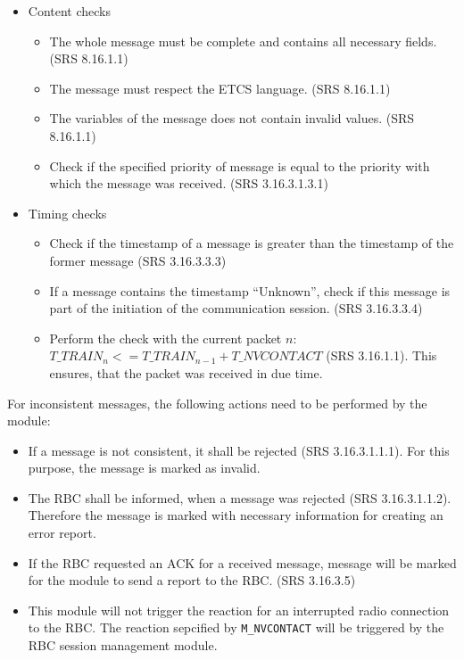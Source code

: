 \documentclass{template/openetcs_report}
\begin{document}
\begin{itemize}
 \item Content checks
 \begin{itemize}
    \item The whole message must be complete and contains all necessary fields. (SRS 8.16.1.1)
    \item The message must respect the ETCS language. (SRS 8.16.1.1)
    \item The variables of the message does not contain invalid values. (SRS 8.16.1.1) %
    \item Check if the specified priority of message is equal to the priority with which the message was received. (SRS 3.16.3.1.3.1) 
  \end{itemize}
  \item Timing checks
  \begin{itemize}
    \item Check if the timestamp of a message is greater than the timestamp of the former message (SRS 3.16.3.3.3)
    \item If a message contains the timestamp ``Unknown'', check if this message is part of the initiation of the communication session. (SRS 3.16.3.3.4)
    \item Perform the check with the current packet $n$:  $T\_TRAIN_{n} <= T\_TRAIN_{n-1} + T\_NVCONTACT$ (SRS 3.16.1.1). This ensures, that the packet was received in due time.
  \end{itemize}
\end{itemize}

For inconsistent messages, the following actions need to be performed by the module:

\begin{itemize}
  \item If a message is not consistent, it shall be rejected (SRS 3.16.3.1.1.1). For this purpose, the message is marked as invalid.
  \item The RBC shall be informed, when a message was rejected (SRS 3.16.3.1.1.2). Therefore the message is marked with necessary information for creating an error report. 
  \item If the RBC requested an ACK for a received message, message will be marked for the module to send a report to the RBC. (SRS 3.16.3.5)
  \item This module will not trigger the reaction for an interrupted radio connection to the RBC. The reaction sepcified by \texttt{M\_NVCONTACT} will be triggered by the RBC session management module.
\end{itemize}
\end{document}

